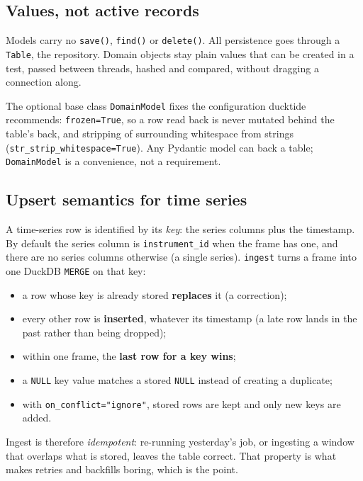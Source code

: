 \documentclass[11pt,a4paper]{article}
\newcommand{\code}[1]{\texttt{#1}}
\begin{document}
\subsection{Values, not active records}

Models carry no \code{save()}, \code{find()} or \code{delete()}. All persistence goes
through a \code{Table}, the repository. Domain objects stay plain values that can be
created in a test, passed between threads, hashed and compared, without dragging a
connection along.

The optional base class \code{DomainModel} fixes the configuration ducktide recommends:
\code{frozen=True}, so a row read back is never mutated behind the table's back, and
stripping of surrounding whitespace from strings (\code{str\_strip\_whitespace=True}). Any Pydantic model can back a table; \code{DomainModel}
is a convenience, not a requirement.

\subsection{Upsert semantics for time series}

A time-series row is identified by its \emph{key}: the series columns plus the timestamp.
By default the series column is \code{instrument\_id} when the frame has one, and there
are no series columns otherwise (a single series). \code{ingest} turns a frame into one
DuckDB \code{MERGE} on that key:

\begin{itemize}
  \item a row whose key is already stored \textbf{replaces} it (a correction);
  \item every other row is \textbf{inserted}, whatever its timestamp (a late row lands
    in the past rather than being dropped);
  \item within one frame, the \textbf{last row for a key wins};
  \item a \code{NULL} key value matches a stored \code{NULL} instead of creating a duplicate;
  \item with \code{on\_conflict="ignore"}, stored rows are kept and only new keys are added.
\end{itemize}

Ingest is therefore \emph{idempotent}: re-running yesterday's job, or ingesting a
window that overlaps what is stored, leaves the table correct. That property is what makes
retries and backfills boring, which is the point.
\end{document}
